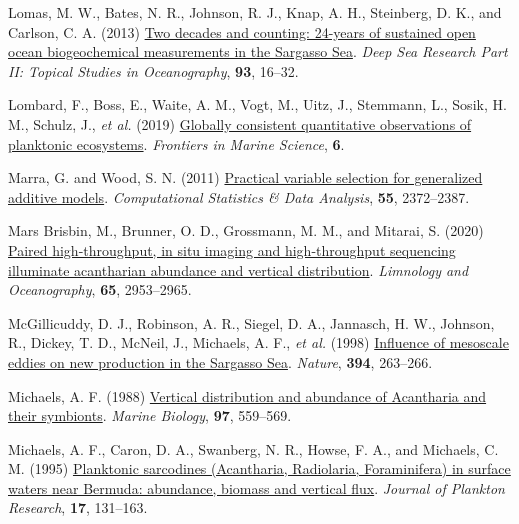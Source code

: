 \documentclass[
]{article}
\newlength{\cslhangindent}
\newlength{\cslentryspacingunit} %
\newenvironment{CSLReferences}[2] %
 {%
  \setlength{\parindent}{0pt}
  \ifodd #1
  \let\oldpar\par
  \def\par{\hangindent=\cslhangindent\oldpar}
  \fi
  \setlength{\parskip}{#2\cslentryspacingunit}
 }%
 {}
\begin{document}
\begin{CSLReferences}{1}{0}
\leavevmode{}%
Lomas, M. W., Bates, N. R., Johnson, R. J., Knap, A. H., Steinberg, D.
K., and Carlson, C. A. (2013)
\href{https://doi.org/10.1016/j.dsr2.2013.01.008}{Two decades and
counting: 24-years of sustained open ocean biogeochemical measurements
in the Sargasso Sea}. \emph{Deep Sea Research Part II: Topical Studies
in Oceanography}, \textbf{93}, 16--32.

\leavevmode{}%
Lombard, F., Boss, E., Waite, A. M., Vogt, M., Uitz, J., Stemmann, L.,
Sosik, H. M., Schulz, J., \emph{et al.} (2019)
\href{https://www.frontiersin.org/articles/10.3389/fmars.2019.00196}{Globally
consistent quantitative observations of planktonic ecosystems}.
\emph{Frontiers in Marine Science}, \textbf{6}.

\leavevmode{}%
Marra, G. and Wood, S. N. (2011)
\href{https://doi.org/10.1016/j.csda.2011.02.004}{Practical variable
selection for generalized additive models}. \emph{Computational
Statistics \& Data Analysis}, \textbf{55}, 2372--2387.

\leavevmode{}%
Mars Brisbin, M., Brunner, O. D., Grossmann, M. M., and Mitarai, S.
(2020) \href{https://doi.org/10.1002/lno.11567}{Paired high-throughput,
in situ imaging and high-throughput sequencing illuminate acantharian
abundance and vertical distribution}. \emph{Limnology and Oceanography},
\textbf{65}, 2953--2965.

\leavevmode{}%
McGillicuddy, D. J., Robinson, A. R., Siegel, D. A., Jannasch, H. W.,
Johnson, R., Dickey, T. D., McNeil, J., Michaels, A. F., \emph{et al.}
(1998) \href{https://doi.org/10.1038/28367}{Influence of mesoscale
eddies on new production in the Sargasso Sea}. \emph{Nature},
\textbf{394}, 263--266.

\leavevmode{}%
Michaels, A. F. (1988)
\href{https://doi.org/10.1007/BF00391052}{Vertical distribution and
abundance of Acantharia and their symbionts}. \emph{Marine Biology},
\textbf{97}, 559--569.

\leavevmode{}%
Michaels, A. F., Caron, D. A., Swanberg, N. R., Howse, F. A., and
Michaels, C. M. (1995)
\href{https://doi.org/10.1093/plankt/17.1.131}{Planktonic sarcodines
(Acantharia, Radiolaria, Foraminifera) in surface waters near Bermuda:
abundance, biomass and vertical flux}. \emph{Journal of Plankton
Research}, \textbf{17}, 131--163.


\end{CSLReferences}
\end{document}
